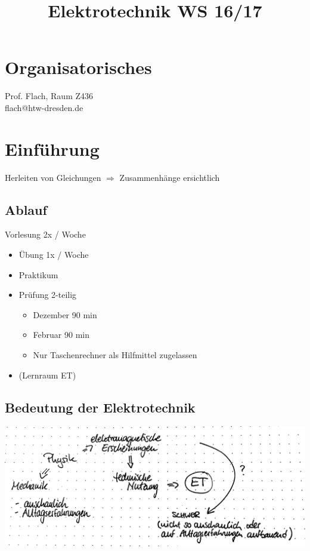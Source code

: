 \documentclass[10pt, a4paper]{article}
\title{Elektrotechnik WS 16/17}
\newcommand{\Ra}{$\Rightarrow$ }
\begin{document}
\maketitle
\tableofcontents
\newpage

\section{Organisatorisches}

Prof. Flach, Raum Z436\\
flach@htw-dresden.de

\section{Einführung}

Herleiten von Gleichungen \Ra Zusammenhänge ersichtlich

\subsection{Ablauf}

Vorlesung 2x / Woche
\begin{itemize}
	\item Übung 1x / Woche
	\item Praktikum
	\item Prüfung 2-teilig
	\begin{itemize}
		\item Dezember 90 min
		\item Februar 90 min
		\item Nur Taschenrechner als Hilfmittel zugelassen
	\end{itemize}
	\item (Lernraum ET)
\end{itemize}

\subsection{Bedeutung der Elektrotechnik}

\includegraphics[width=\textwidth]{img/1}
\end{document}
